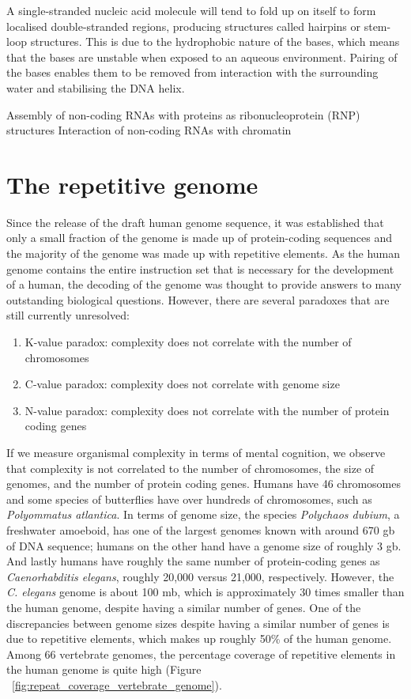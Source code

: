 A single-stranded nucleic acid molecule will tend to fold up on itself to form localised double-stranded regions, producing structures called hairpins or stem-loop structures. This is due to the hydrophobic nature of the bases, which means that the bases are unstable when exposed to an aqueous environment. Pairing of the bases enables them to be removed from interaction with the surrounding water and stabilising the DNA helix.

Assembly of non-coding RNAs with proteins as ribonucleoprotein (RNP) structures
Interaction of non-coding RNAs with chromatin

\section{The repetitive genome}

Since the release of the draft human genome sequence\cite{venter2001sequence, lander2001initial}, it was established that only a small fraction of the genome is made up of protein-coding sequences and the majority of the genome was made up with repetitive elements. As the human genome contains the entire instruction set that is necessary for the development of a human, the decoding of the genome was thought to provide answers to many outstanding biological questions. However, there are several paradoxes that are still currently unresolved:

\begin{enumerate}
   \item K-value paradox: complexity does not correlate with the number of chromosomes
   \item C-value paradox: complexity does not correlate with genome size
   \item N-value paradox: complexity does not correlate with the number of protein coding genes
\end{enumerate}

If we measure organismal complexity in terms of mental cognition, we observe that complexity is not correlated to the number of chromosomes, the size of genomes, and the number of protein coding genes. Humans have 46 chromosomes and some species of butterflies have over hundreds of chromosomes, such as \textit{Polyommatus atlantica}. In terms of genome size, the species \textit{Polychaos dubium}, a freshwater amoeboid, has one of the largest genomes known with around 670 gb of DNA sequence; humans on the other hand have a genome size of roughly 3 gb. And lastly humans have roughly the same number of protein-coding genes as \textit{Caenorhabditis elegans}, roughly 20,000 versus 21,000, respectively. However, the \textit{C. elegans} genome is about 100 mb\cite{celegans1998sequencing}, which is approximately 30 times smaller than the human genome, despite having a similar number of genes. One of the discrepancies between genome sizes despite having a similar number of genes is due to repetitive elements, which makes up roughly 50\% of the human genome. Among 66 vertebrate genomes, the percentage coverage of repetitive elements in the human genome is quite high (Figure ~\ref{fig:repeat_coverage_vertebrate_genome}).


